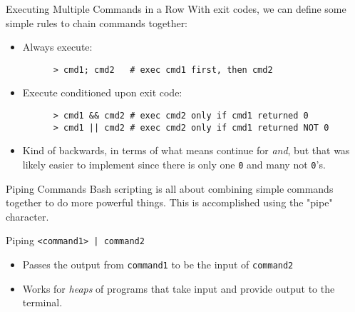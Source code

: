\documentclass[11pt]{beamer}
\newcommand{\colbf}[1]{\textcolor{mLightBrown!77!black}{#1}}%
\begin{document}
\begin{frame}[fragile]{Executing Multiple Commands in a Row}
  With exit codes, we can define some simple rules to chain commands together:

  \begin{itemize}[<+- | alert@+>]
    \item Always execute:

    \begin{verbatim}
      > cmd1; cmd2   # exec cmd1 first, then cmd2
    \end{verbatim}

    \item Execute conditioned upon exit code:

    \begin{verbatim}
      > cmd1 && cmd2 # exec cmd2 only if cmd1 returned 0
      > cmd1 || cmd2 # exec cmd2 only if cmd1 returned NOT 0
    \end{verbatim}

    \item Kind of backwards, in terms of what means continue for \emph{and}, but that was likely easier to implement
          since there is only one \texttt{0} and many \colbf{not} \texttt{0}'s.
  \end{itemize}
\end{frame}

\begin{frame}[fragile]{Piping Commands}
  Bash scripting is all about combining simple commands together to do more powerful things.  This is accomplished
  using the "pipe" character.

  \begin{block}{Piping}
    \texttt{<command1> | command2}
    \begin{itemize}
      \item Passes the output from \texttt{command1} to be the input of \texttt{command2}
      \item Works for \emph{heaps} of programs that take input and provide output to the terminal.
    \end{itemize}
  \end{block}
\end{frame}
\end{document}
